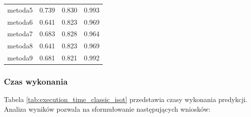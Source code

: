 \begin{table}[H]
\begin{tabular}{lccc}
		metoda5           & 0.739         & 0.830            & 0.993          \\
		metoda6           & 0.641         & 0.823            & 0.969          \\
		metoda7           & 0.683         & 0.828            & 0.964          \\
		metoda8           & 0.641         & 0.823            & 0.969          \\
		metoda9           & 0.681         & 0.821            & 0.992          \\
		\bottomrule
	\end{tabular}
\end{table}

\subsubsection{Czas wykonania}
Tabela \ref{tab:execution_time_classic_isot} przedstawia czasy wykonania predykcji. Analiza wyników pozwala na sformułowanie następujących wniosków:

